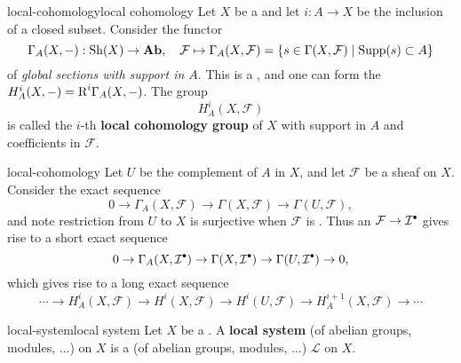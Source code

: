 \begin{topic}{local-cohomology}{local cohomology}
    Let $X$ be a  and let $i : A \to X$ be the inclusion of a closed subset. Consider the functor
    \[ \Gamma_A(X, -) : \textup{Sh}(X) \to \textbf{Ab}, \quad \mathcal{F} \mapsto \Gamma_A(X, \mathcal{F}) = \{ s \in \Gamma(X, \mathcal{F}) \;|\;\textup{Supp}(s) \subset A \} \]
    of \textit{global sections with support in $A$}. This is a , and one can form the  $H_A^i(X, -) = \textup{R}^i \Gamma_A(X, -)$. The group
    \[ H_A^i(X, \mathcal{F}) \]
    is called the $i$-th \textbf{local cohomology group} of $X$ with support in $A$ and coefficients in $\mathcal{F}$.
\end{topic}

\begin{example}{local-cohomology}
    Let $U$ be the complement of $A$ in $X$, and let $\mathcal{F}$ be a sheaf on $X$. Consider the exact sequence
    \[ 0 \to \Gamma_A(X, \mathcal{F}) \to \Gamma(X, \mathcal{F}) \to \Gamma(U, \mathcal{F}) , \]
    and note restriction from $U$ to $X$ is surjective when $\mathcal{F}$ is . Thus an  $\mathcal{F} \to \mathcal{I}^\bdot$ gives rise to a short exact sequence
    \[ 0 \to \Gamma_A(X, \mathcal{I}^\bdot) \to \Gamma(X, \mathcal{I}^\bdot) \to \Gamma(U, \mathcal{I}^\bdot) \to 0 , \]
    which gives rise to a long exact sequence
    \[ \cdots \to H_A^i(X, \mathcal{F}) \to H^i(X, \mathcal{F}) \to H^i(U, \mathcal{F}) \to H_A^{i + 1}(X, \mathcal{F}) \to \cdots \]
\end{example}

\begin{topic}{local-system}{local system}
    Let $X$ be a . A \textbf{local system} (of abelian groups, modules, ...) on $X$ is a  (of abelian groups, modules, ...) $\mathcal{L}$ on $X$.
\end{topic}
